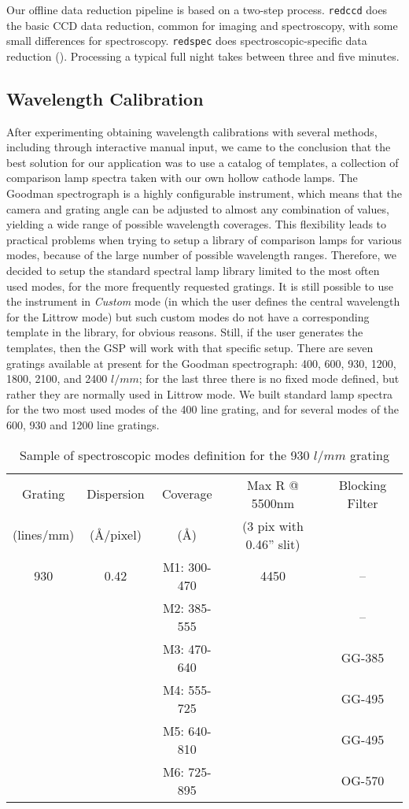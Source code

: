 \documentclass[11pt,twoside]{article}
\begin{document}
Our offline data reduction pipeline is based on a two-step process. \verb=redccd= does the basic CCD data reduction, common for imaging and spectroscopy, with some small differences for spectroscopy. \verb=redspec= does spectroscopic-specific data reduction (\citet{2013pss2.book...35M}). Processing a typical full night takes between three and five minutes.

\subsection{Wavelength Calibration}

After experimenting obtaining wavelength calibrations with several methods, including through interactive manual input, we came to the conclusion that the best solution for our application was to use a catalog of templates, a collection of comparison lamp spectra taken with our own hollow cathode lamps. The Goodman spectrograph is a highly configurable instrument, which means that the camera and grating angle can be adjusted to almost any combination of values, yielding a wide range of possible wavelength coverages. This flexibility leads to practical problems when trying to setup a library of comparison lamps for various modes, because of the large number of possible wavelength ranges.  Therefore, we decided to setup the standard spectral lamp library limited to the most often used modes, for the more frequently requested gratings. It is still possible to use the instrument in \emph{Custom} mode (in which the user defines the central wavelength for the Littrow mode) but such custom modes do not have a corresponding template in the library, for obvious reasons. Still, if the user generates the templates, then the GSP will work with that specific setup. There are seven gratings available at present for the Goodman spectrograph: 400, 600, 930, 1200, 1800, 2100, and 2400 $l/mm$; for the last three there is no fixed mode defined, but rather they are normally used in Littrow mode. We built standard lamp spectra for the two most used modes of the 400 line grating, and for several modes of the 600, 930 and 1200 line gratings.

\begin{table}[!ht]
\caption{Sample of spectroscopic modes definition for the 930 $l/mm$ grating}
\begin{tabular}{|c|c|c|c|c|}
\hline
    Grating  & Dispersion & Coverage& Max R @ 5500nm & Blocking Filter \\
    (lines/mm) & (\AA/pixel)  &  (\AA)  & (3 pix with 0.46'' slit) & \\
\hline
    930 & 0.42 & M1: 300-470& 4450 & -- \\
    & & M2: 385-555 & & -- \\
    & & M3: 470-640 & & GG-385\\
    & & M4: 555-725 & & GG-495\\
    & & M5: 640-810 & & GG-495\\
    & & M6: 725-895 & & OG-570\\
\hline
\end{tabular}
\end{table}
\end{document}
